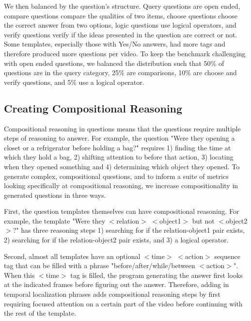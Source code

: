
We then balanced by the question's structure. Query questions are open ended, compare questions compare the qualities of two items, choose questions choose the correct answer from two options, logic questions use logical operators, and verify questions verify if the ideas presented in the question are correct or not. Some templates, especially those with Yes/No answers, had more tags and therefore produced more questions per video. To keep the benchmark challenging with open ended questions, we balanced the distribution such that 50\% of questions are in the  query category, 25\% are comparisons, 10\% are choose and verify questions, and 5\% use a logical operator.%


\subsection{Creating Compositional Reasoning}

Compositional reasoning in questions means that the questions require multiple steps of reasoning to answer. For example, the question "Were they opening a closet or a refrigerator before holding a bag?" requires 1) finding the time at which they hold a bag, 2) shifting attention to before that action, 3) locating when they opened something and 4) determining which object they opened. To generate complex, compositional questions, and to inform a suite of metrics looking specifically at compositional reasoning, we increase compositionality in generated questions in three ways.

First, the question templates themselves can have compositional reasoning. For example, the template "Were they $<$relation$>$ $<$object1$>$ but not $<$object2$>$?" has three reasoning steps 1) searching for if the relation-object1 pair exists, 2) searching for if the relation-object2 pair exists, and 3) a logical operator. 

Second, almost all templates have an optional $<$time$>$ $<$action$>$ sequence tag that can be filled with a phrase "before/after/while/between $<$action$>$". When this $<$time$>$ tag is filled, the program generating the answer first looks at the indicated frames before figuring out the answer. Therefore, adding in temporal localization phrases adds compositional reasoning steps by first requiring focused attention on a certain part of the video before continuing with the rest of the template.

